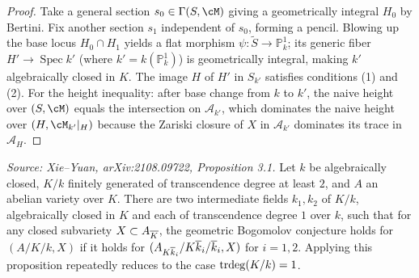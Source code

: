 \begin{proof}
  Take a general section \(s_0 \in \Gamma(S,\cM)\) giving a geometrically integral \(H_0\)
  by Bertini.  Fix another section \(s_1\) independent of \(s_0\), forming a pencil.
  Blowing up the base locus \(H_0 \cap H_1\) yields a flat morphism
  \(\psi\colon \widetilde{S} \to \mathbb{P}^1_k\); its generic fiber \(H' \to \operatorname{Spec}k'\)
  (where \(k' = k(\mathbb{P}^1_k)\)) is geometrically integral, making \(k'\) algebraically
  closed in \(K\).  The image \(H\) of \(H'\) in \(S_{k'}\) satisfies conditions (1) and (2).
  For the height inequality: after base change from \(k\) to \(k'\), the naive height over
  \((S,\cM)\) equals the intersection on \(\mathcal{A}_{k'}\), which dominates the naive
  height over \((H, \cM_{k'}|_H)\) because the Zariski closure of \(X\) in \(\mathcal{A}_{k'}\)
  dominates its trace in \(\mathcal{A}_H\).
\end{proof}

\begin{proposition}
  \label{pro:changeField}
  \textit{Source: Xie--Yuan, arXiv:2108.09722, Proposition 3.1.}
  Let \(k\) be algebraically closed, \(K/k\) finitely generated of transcendence degree at
  least \(2\), and \(A\) an abelian variety over \(K\).
  There are two intermediate fields \(k_1, k_2\) of \(K/k\), algebraically closed in \(K\)
  and each of transcendence degree \(1\) over \(k\), such that for any closed subvariety
  \(X \subset A_{\overline{K}}\), the geometric Bogomolov conjecture holds for \((A/K/k,X)\) if it
  holds for \((A_{K\overline{k}_i}/K\overline{k}_i/\overline{k}_i, X)\) for \(i=1,2\).
  Applying this proposition repeatedly reduces to the case \(\operatorname{trdeg}(K/k)=1\).
\end{proposition}

